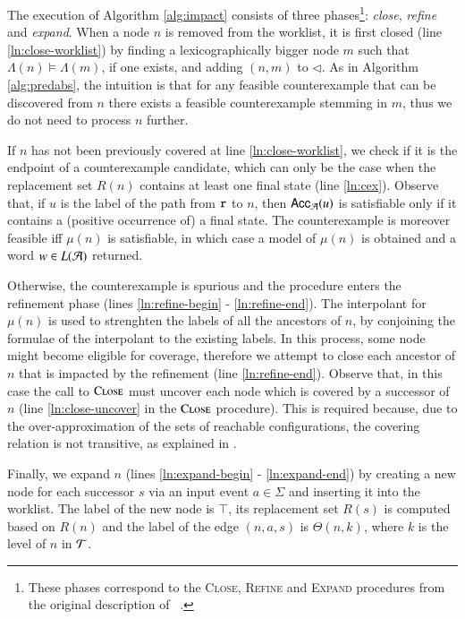 \documentclass[10pt,conference,letterpaper,twocolumn]{IEEEtran}
\begin{document}
The execution of Algorithm \ref{alg:impact} consists of three
phases\footnote{These phases correspond to the \textsc{Close},
  \textsc{Refine} and \textsc{Expand} procedures from the original
  description of \impact~\cite{mcmillan06}.}: \emph{close},
\emph{refine} and \emph{expand}. When a node $n$ is removed from the
worklist, it is first closed (line \ref{ln:close-worklist}) by finding
a lexicographically bigger node $m$ such that $\Lambda(n) \models
\Lambda(m)$, if one exists, and adding $(n,m)$ to $\lhd$. As in
Algorithm \ref{alg:predabs}, the intuition is that for any feasible
counterexample that can be discovered from $n$ there exists a feasible
counterexample stemming in $m$, thus we do not need to process $n$
further.

If $n$ has not been previously covered at line
\ref{ln:close-worklist}, we check if it is the endpoint of a
counterexample candidate, which can only be the case when the
replacement set $R(n)$ contains at least one final state (line
\ref{ln:cex}). Observe that, if $u$ is the label of the path from
$\mathtt{r}$ to $n$, then $\mathsf{Acc}_{\mathcal{A}}(u)$ is satisfiable only if it
contains a (positive occurrence of) a final state. The counterexample
is moreover feasible iff $\mu(n)$ is satisfiable, in which case a model of
$\mu(n)$ is obtained and a word $w \in L(\mathcal{A})$ returned. 

Otherwise, the counterexample is spurious and the procedure enters the
refinement phase (lines \ref{ln:refine-begin} -
\ref{ln:refine-end}). The interpolant for $\mu(n)$ is used to
strenghten the labels of all the ancestors of $n$, by conjoining the
formulae of the interpolant to the existing labels. In this process,
some node might become eligible for coverage, therefore we attempt to
close each ancestor of $n$ that is impacted by the refinement (line
\ref{ln:refine-end}). Observe that, in this case the call to
$\Call{Close}{}$ must uncover each node which is covered by a
successor of $n$ (line \ref{ln:close-uncover} in the $\Call{Close}{}$
procedure). This is required because, due to the over-approximation of
the sets of reachable configurations, the covering relation is not
transitive, as explained in \cite{mcmillan06}.

Finally, we expand $n$ (lines \ref{ln:expand-begin} -
\ref{ln:expand-end}) by creating a new node for each successor $s$ via
an input event $a \in \Sigma$ and inserting it into the worklist. The
label of the new node is $\top$, its replacement set $R(s)$ is
computed based on $R(n)$ and the label of the edge $(n,a,s)$ is
$\Theta(n,k)$, where $k$ is the level of $n$ in $\mathcal{T}$.

 

\end{document}
